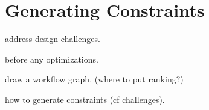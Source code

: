 \section{Generating Constraints}
\label{s:gen}

address design challenges.

before any optimizations.

draw a workflow graph. (where to put ranking?)

how to generate constraints (cf challenges).
